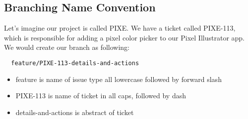 \subsection { Branching Name Convention }
Let's imagine our project is called PIXE. We have a ticket called PIXE-113,
which is responsible for adding a pixel color picker to our Pixel Illustrator
app. We would create our branch as following:

\begin{verbatim}
  feature/PIXE-113-details-and-actions
\end{verbatim}

\begin{itemize}
  \item feature is name of issue type all lowercase followed by forward slash
  \item PIXE-113 is name of ticket in all caps, followed by dash
  \item details-and-actions is abstract of ticket
\end{itemize}

